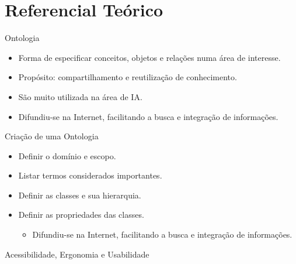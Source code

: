 \section{Referencial Teórico}\label{sec:referencial-teorico}
\begin{frame}[allowframebreaks]{Ontologia}
	\begin{itemize}
		\setlength{\itemsep}{0.5em}
		\item<1-> Forma de especificar conceitos, objetos e relações numa área de interesse.
		\item<1-> Propósito: compartilhamento e reutilização de conhecimento.
		\item<1-> São muito utilizada na área de IA.
		\item<1-> Difundiu-se na Internet, facilitando a busca e integração de informações.
	\end{itemize}
\end{frame}

\begin{frame}[allowframebreaks]{Criação de uma Ontologia}
	\begin{itemize}
		\setlength{\itemsep}{0.5em}
		\item<1-> Definir o domínio e escopo.
		\item<1-> Listar termos considerados importantes.
		\item<1-> Definir as classes e sua hierarquia.
		\item<1-> Definir as propriedades das classes.
		\begin{itemize}
			\item<1-> Difundiu-se na Internet, facilitando a busca e integração de informações.
		\end{itemize}
	\end{itemize}
\end{frame}

\begin{frame}[allowframebreaks]{Acessibilidade, Ergonomia e Usabilidade}
	
\end{frame}

